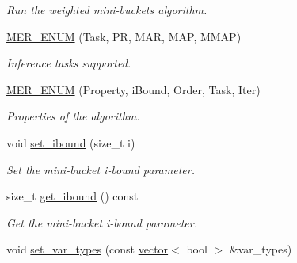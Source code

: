 \begin{DoxyCompactItemize}
\begin{DoxyCompactList}\small\item\em Run the weighted mini-\/buckets algorithm. \end{DoxyCompactList}\item 
\hypertarget{classmerlin_1_1wmb_af800e4c2c35e845cc47bab94ef156aac}{}\hyperlink{classmerlin_1_1wmb_af800e4c2c35e845cc47bab94ef156aac}{M\+E\+R\+\_\+\+E\+N\+U\+M} (Task, P\+R, M\+A\+R, M\+A\+P, M\+M\+A\+P)\label{classmerlin_1_1wmb_af800e4c2c35e845cc47bab94ef156aac}

\begin{DoxyCompactList}\small\item\em Inference tasks supported. \end{DoxyCompactList}\item 
\hypertarget{classmerlin_1_1wmb_a1224afb59d67282bf170262995fc0bd6}{}\hyperlink{classmerlin_1_1wmb_a1224afb59d67282bf170262995fc0bd6}{M\+E\+R\+\_\+\+E\+N\+U\+M} (Property, i\+Bound, Order, Task, Iter)\label{classmerlin_1_1wmb_a1224afb59d67282bf170262995fc0bd6}

\begin{DoxyCompactList}\small\item\em Properties of the algorithm. \end{DoxyCompactList}\item 
\hypertarget{classmerlin_1_1wmb_a0d1389be67caece79708d4914ff03185}{}void \hyperlink{classmerlin_1_1wmb_a0d1389be67caece79708d4914ff03185}{set\+\_\+ibound} (size\+\_\+t i)\label{classmerlin_1_1wmb_a0d1389be67caece79708d4914ff03185}

\begin{DoxyCompactList}\small\item\em Set the mini-\/bucket i-\/bound parameter. \end{DoxyCompactList}\item 
\hypertarget{classmerlin_1_1wmb_ae625b40db68f51aadb954da99e48bc52}{}size\+\_\+t \hyperlink{classmerlin_1_1wmb_ae625b40db68f51aadb954da99e48bc52}{get\+\_\+ibound} () const \label{classmerlin_1_1wmb_ae625b40db68f51aadb954da99e48bc52}

\begin{DoxyCompactList}\small\item\em Get the mini-\/bucket i-\/bound parameter. \end{DoxyCompactList}\item 
\hypertarget{classmerlin_1_1wmb_a0dcda9d7c557d77435aa0363e793018e}{}void \hyperlink{classmerlin_1_1wmb_a0dcda9d7c557d77435aa0363e793018e}{set\+\_\+var\+\_\+types} (const \hyperlink{classmerlin_1_1vector}{vector}$<$ bool $>$ \&var\+\_\+types)\label{classmerlin_1_1wmb_a0dcda9d7c557d77435aa0363e793018e}


\end{DoxyCompactItemize}
